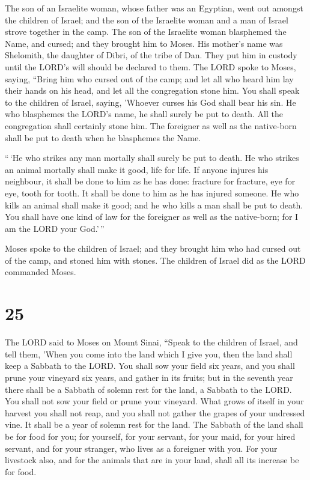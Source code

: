  The son of an Israelite woman, whose father was an
Egyptian, went out amongst the children of Israel; and the son of the
Israelite woman and a man of Israel strove together in the camp.
 The son of the Israelite woman blasphemed the Name, and
cursed; and they brought him to Moses. His mother's name was Shelomith,
the daughter of Dibri, of the tribe of Dan.  They put him
in custody until the LORD's will should be declared to them.
 The LORD spoke to Moses, saying,  ``Bring
him who cursed out of the camp; and let all who heard him lay their
hands on his head, and let all the congregation stone him.
 You shall speak to the children of Israel, saying,
'Whoever curses his God shall bear his sin.  He who
blasphemes the LORD's name, he shall surely be put to death. All the
congregation shall certainly stone him. The foreigner as well as the
native-born shall be put to death when he blasphemes the Name.

 ``\,`He who strikes any man mortally shall surely be put
to death.  He who strikes an animal mortally shall make
it good, life for life.  If anyone injures his neighbour,
it shall be done to him as he has done:  fracture for
fracture, eye for eye, tooth for tooth. It shall be done to him as he
has injured someone.  He who kills an animal shall make
it good; and he who kills a man shall be put to death. 
You shall have one kind of law for the foreigner as well as the
native-born; for I am the LORD your God.'\,''

 Moses spoke to the children of Israel; and they brought
him who had cursed out of the camp, and stoned him with stones. The
children of Israel did as the LORD commanded Moses.

\hypertarget{section-24}{%
\section{25}\label{section-24}}

 The LORD said to Moses on Mount Sinai, 
``Speak to the children of Israel, and tell them, 'When you come into
the land which I give you, then the land shall keep a Sabbath to the
LORD.  You shall sow your field six years, and you shall
prune your vineyard six years, and gather in its fruits; 
but in the seventh year there shall be a Sabbath of solemn rest for the
land, a Sabbath to the LORD. You shall not sow your field or prune your
vineyard.  What grows of itself in your harvest you shall
not reap, and you shall not gather the grapes of your undressed vine. It
shall be a year of solemn rest for the land.  The Sabbath
of the land shall be for food for you; for yourself, for your servant,
for your maid, for your hired servant, and for your stranger, who lives
as a foreigner with you.  For your livestock also, and for
the animals that are in your land, shall all its increase be for food.

